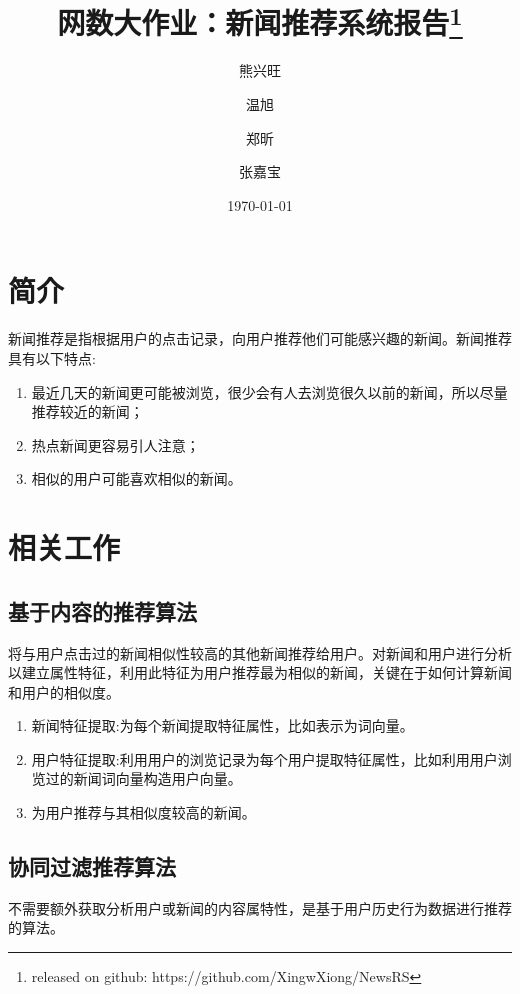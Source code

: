 \documentclass[UTF8]{article}
\begin{document}
\title{网数大作业：新闻推荐系统报告\footnote{released on github: https://github.com/XingwXiong/NewsRS}}
\author[*]{熊兴旺}
\author[*]{温旭}
\author[*]{郑昕}
\author[*]{张嘉宝}

\date{\normalsize\today}
\clearpage
\maketitle

\tableofcontents

\newpage
\section{简介}
	新闻推荐是指根据用户的点击记录，向用户推荐他们可能感兴趣的新闻。新闻推荐具有以下特点:
    \begin{enumerate}
        \item 最近几天的新闻更可能被浏览，很少会有人去浏览很久以前的新闻，所以尽量推荐较近的新闻；
        \item 热点新闻更容易引人注意；
        \item 相似的用户可能喜欢相似的新闻。
    \end{enumerate}
\section{相关工作}
\subsection{基于内容的推荐算法}
	将与用户点击过的新闻相似性较高的其他新闻推荐给用户。对新闻和用户进行分析以建立属性特征，利用此特征为用户推荐最为相似的新闻，关键在于如何计算新闻和用户的相似度。
	\begin{enumerate}
		\item 新闻特征提取:为每个新闻提取特征属性，比如表示为词向量。
        \item 用户特征提取:利用用户的浏览记录为每个用户提取特征属性，比如利用用户浏览过的新闻词向量构造用户向量。
        \item 为用户推荐与其相似度较高的新闻。
	\end{enumerate}

\subsection{协同过滤推荐算法}
不需要额外获取分析用户或新闻的内容属特性，是基于用户历史行为数据进行推荐的算法。
\end{document}

